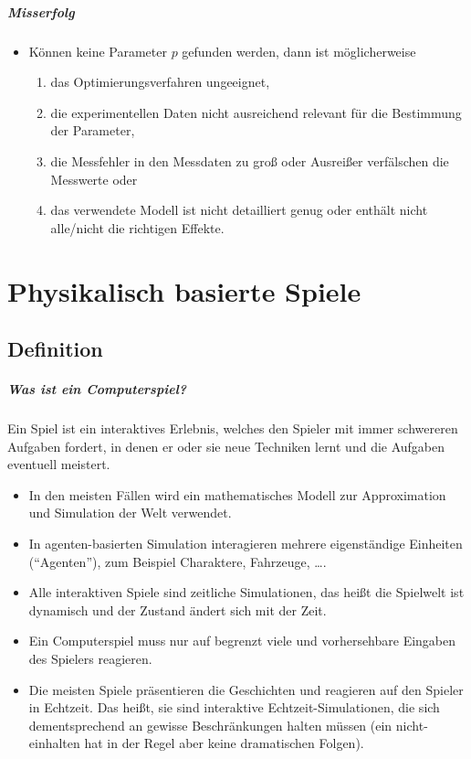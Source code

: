            \paragraph{Misserfolg}
                \begin{itemize}
                	\item Können keine Parameter \(p\) gefunden werden, dann ist möglicherweise
	                	\begin{enumerate}
	                		\item das Optimierungsverfahren ungeeignet,
	                		\item die experimentellen Daten nicht ausreichend relevant für die Bestimmung der Parameter,
	                		\item die Messfehler in den Messdaten zu groß oder Ausreißer verfälschen die Messwerte oder
	                		\item das verwendete Modell ist nicht detailliert genug oder enthält nicht alle/nicht die richtigen Effekte.
	                	\end{enumerate}
            	\end{itemize}

\chapter{Physikalisch basierte Spiele} %
    \section{Definition} %
        \paragraph{Was ist ein Computerspiel?}
            Ein Spiel ist ein interaktives Erlebnis, welches den Spieler mit immer schwereren Aufgaben fordert, in denen er oder sie neue Techniken lernt und die Aufgaben eventuell meistert.
            
            \begin{itemize}
            	\item In den meisten Fällen wird ein mathematisches Modell zur Approximation und Simulation der Welt verwendet.
            	\item In agenten-basierten Simulation interagieren mehrere eigenständige Einheiten (\enquote{Agenten}), zum Beispiel Charaktere, Fahrzeuge, \dots.
            	\item Alle interaktiven Spiele sind zeitliche Simulationen, das heißt die Spielwelt ist dynamisch und der Zustand ändert sich mit der Zeit.
            	\item Ein Computerspiel muss nur auf begrenzt viele und vorhersehbare Eingaben des Spielers reagieren.
            	\item Die meisten Spiele präsentieren die Geschichten und reagieren auf den Spieler in Echtzeit. Das heißt, sie sind interaktive Echtzeit-Simulationen, die sich dementsprechend an gewisse Beschränkungen halten müssen (ein nicht-einhalten hat in der Regel aber keine dramatischen Folgen).
            \end{itemize}

